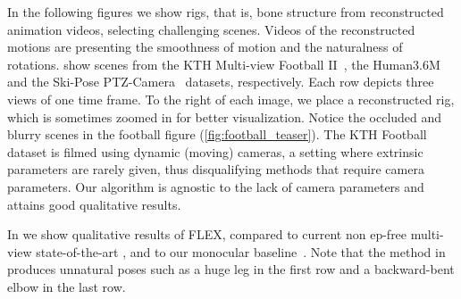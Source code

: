 


In the following figures we show rigs, that is, bone structure 
from reconstructed animation videos, selecting challenging %
scenes. Videos of the reconstructed motions are  
\fi
presenting the smoothness of motion and the naturalness of rotations. 
 show scenes from the KTH Multi-view Football II~\cite{footballDS}, the Human3.6M~\cite{h36m_pami,IonescuSminchisescu11} and the Ski-Pose PTZ-Camera~\cite{ski_ptz} datasets, respectively. 
Each row depicts three views of one time frame. To the right of each image, we place a reconstructed rig, which is sometimes zoomed in for better visualization. 
Notice the occluded and blurry scenes in the football figure (\ref{fig:football_teaser}). The KTH Football dataset is filmed using dynamic (moving) cameras, 
a setting where extrinsic parameters are rarely given, thus disqualifying methods that require camera parameters.
Our algorithm is agnostic to the lack of camera parameters and attains good qualitative results. 

In  we show qualitative results of FLEX, compared to current non ep-free  multi-view state-of-the-art \cite{iskakov2019learnable}, and to our monocular baseline~\cite{shi2020motionet}. 
Note that the method in \cite{iskakov2019learnable} produces unnatural poses such as a huge leg in the first row and a backward-bent elbow in the last row. 





